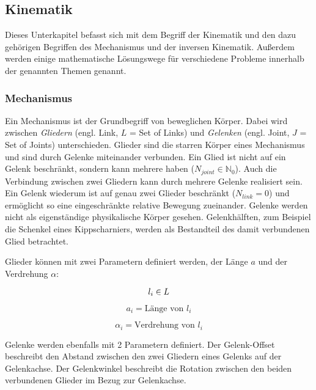 \subsection{Kinematik }
\label{sec:basics-ik}
    
Dieses Unterkapitel befasst sich mit dem Begriff der Kinematik und den dazu gehörigen Begriffen des Mechanismus und der inversen Kinematik. Außerdem werden einige mathematische Lösungswege für verschiedene Probleme innerhalb der genannten Themen genannt.

\subsubsection{Mechanismus}

Ein Mechanismus ist der Grundbegriff von beweglichen Körper. Dabei wird zwischen \textit{Gliedern} (engl. Link, $L$ = Set of Links) und \textit{Gelenken} (engl. Joint, $J$ = Set of Joints) unterschieden. Glieder sind die starren Körper eines Mechanismus und sind durch Gelenke miteinander verbunden. Ein Glied ist nicht auf ein Gelenk beschränkt, sondern kann mehrere haben ($N_{joint} \in \mathds{N}_0$). Auch die Verbindung zwischen zwei Gliedern kann durch mehrere  Gelenke realisiert sein. Ein Gelenk wiederum ist auf genau zwei Glieder beschränkt  ($N_{link} = 0$) und ermöglicht so eine eingeschränkte relative Bewegung zueinander. Gelenke werden nicht als eigenständige physikalische Körper gesehen. Gelenkhälften, zum Beispiel die Schenkel eines Kippscharniers, werden als Bestandteil des damit verbundenen Glied betrachtet.

Glieder können mit zwei Parametern definiert werden, der Länge $a$ und der Verdrehung $\alpha$:

\begin{displaymath}
	l_i \in L \\
\end{displaymath}

\begin{equation}
a_i =  \text{Länge von } l_i
\end{equation}

\begin{equation}
\alpha_i =  \text{Verdrehung von } l_i 
\end{equation}

Gelenke werden ebenfalls mit 2 Parametern definiert. Der Gelenk-Offset beschreibt den Abstand zwischen den zwei Gliedern eines Gelenks auf der Gelenkachse. Der Gelenkwinkel beschreibt die Rotation zwischen den beiden verbundenen Glieder im Bezug zur Gelenkachse. \cite{Corke2011}

